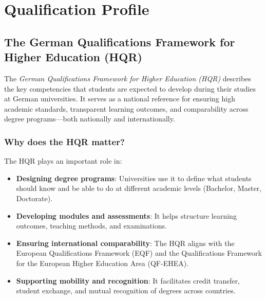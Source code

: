 \documentclass[
  letterpaper,
  10pt,
  openany]{book}
\providecommand{\tightlist}{%
  \setlength{\itemsep}{0pt}\setlength{\parskip}{0pt}}\usepackage{longtable,booktabs,array}
\begin{document}
\chapter*{Qualification Profile}\label{qualification-profile}


\section*{The German Qualifications Framework for Higher Education
(HQR)}\label{the-german-qualifications-framework-for-higher-education-hqr}


The \emph{German Qualifications Framework for Higher Education (HQR)}
describes the key competencies that students are expected to develop
during their studies at German universities. It serves as a national
reference for ensuring high academic standards, transparent learning
outcomes, and comparability across degree programs---both nationally and
internationally.

\subsection*{Why does the HQR matter?}\label{why-does-the-hqr-matter}

The HQR plays an important role in:

\begin{itemize}
\tightlist
\item
  \textbf{Designing degree programs}: Universities use it to define what
  students should know and be able to do at different academic levels
  (Bachelor, Master, Doctorate).
\item
  \textbf{Developing modules and assessments}: It helps structure
  learning outcomes, teaching methods, and examinations.
\item
  \textbf{Ensuring international comparability}: The HQR aligns with the
  European Qualifications Framework (EQF) and the Qualifications
  Framework for the European Higher Education Area (QF-EHEA).
\item
  \textbf{Supporting mobility and recognition}: It facilitates credit
  transfer, student exchange, and mutual recognition of degrees across
  countries.
\end{itemize}
\end{document}
